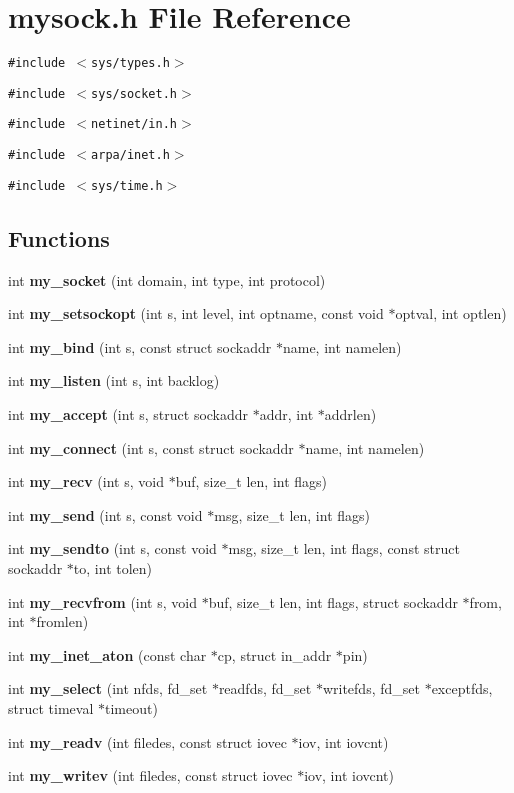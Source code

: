 \section{mysock.h File Reference}
\label{mysock_8h}
{\tt \#include $<$sys/types.h$>$}\par
{\tt \#include $<$sys/socket.h$>$}\par
{\tt \#include $<$netinet/in.h$>$}\par
{\tt \#include $<$arpa/inet.h$>$}\par
{\tt \#include $<$sys/time.h$>$}\par
\subsection*{Functions}
\begin{CompactItemize}
\item 
int {\bf my\_\-socket} (int domain, int type, int protocol)
\item 
int {\bf my\_\-setsockopt} (int s, int level, int optname, const void $\ast$optval, int optlen)
\item 
int {\bf my\_\-bind} (int s, const struct sockaddr $\ast$name, int namelen)
\item 
int {\bf my\_\-listen} (int s, int backlog)
\item 
int {\bf my\_\-accept} (int s, struct sockaddr $\ast$addr, int $\ast$addrlen)
\item 
int {\bf my\_\-connect} (int s, const struct sockaddr $\ast$name, int namelen)
\item 
int {\bf my\_\-recv} (int s, void $\ast$buf, size\_\-t len, int flags)
\item 
int {\bf my\_\-send} (int s, const void $\ast$msg, size\_\-t len, int flags)
\item 
int {\bf my\_\-sendto} (int s, const void $\ast$msg, size\_\-t len, int flags, const struct sockaddr $\ast$to, int tolen)
\item 
int {\bf my\_\-recvfrom} (int s, void $\ast$buf, size\_\-t len, int flags, struct sockaddr $\ast$from, int $\ast$fromlen)
\item 
int {\bf my\_\-inet\_\-aton} (const char $\ast$cp, struct in\_\-addr $\ast$pin)
\item 
int {\bf my\_\-select} (int nfds, fd\_\-set $\ast$readfds, fd\_\-set $\ast$writefds, fd\_\-set $\ast$exceptfds, struct timeval $\ast$timeout)
\item 
int {\bf my\_\-readv} (int filedes, const struct iovec $\ast$iov, int iovcnt)
\item 
int {\bf my\_\-writev} (int filedes, const struct iovec $\ast$iov, int iovcnt)
\end{CompactItemize}


